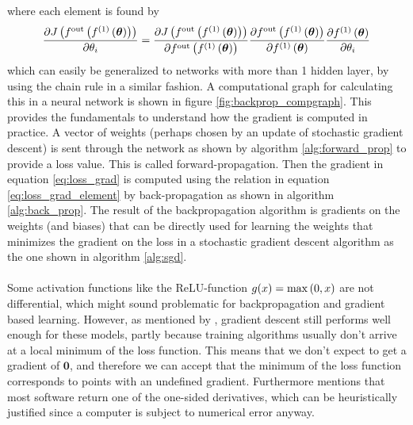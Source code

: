 where each element is found by
\begin{equation} \label{eq:loss_grad_element}
    \frac{\partial J\left (f^{\text{out}} \left (f^{(1)}\left (\boldsymbol{\theta}\right)\right)\right)}{\partial \theta_i} = \frac{\partial J\left (f^{\text{out}} \left (f^{(1)}\left (\boldsymbol{\theta}\right)\right)\right)}{\partial f^{\text{out}} \left (f^{(1)}\left (\boldsymbol{\theta}\right)\right)} 
    \frac{\partial f^{\text{out}} \left (f^{(1)}\left (\boldsymbol{\theta}\right)\right)}{\partial f^{(1)}\left (\boldsymbol{\theta}\right)} 
    \frac{\partial f^{(1)}\left (\boldsymbol{\theta}\right)}{\partial \theta_i}
\end{equation}
which can easily be generalized to networks with more than 1 hidden layer, by using the chain rule in a similar fashion. A computational graph for calculating this in a neural network is shown in figure \ref{fig:backprop_compgraph}. This provides the fundamentals to understand how the gradient is computed in practice. A vector of weights (perhaps chosen by an update of stochastic gradient descent) is sent through the network as shown by algorithm \ref{alg:forward_prop} to provide a loss value. This is called forward-propagation. Then the gradient in equation \ref{eq:loss_grad} is computed using the relation in equation \ref{eq:loss_grad_element} by back-propagation as shown in algorithm \ref{alg:back_prop}. The result of the backpropagation algorithm is gradients on the weights (and biases) that can be directly used for learning the weights that minimizes the gradient on the loss in a stochastic gradient descent algorithm as the one shown in algorithm \ref{alg:sgd}.\\
\\
Some activation functions like the ReLU-function $g(x) = \max \left (0, x\right)$ are not differential, which might sound problematic for backpropagation and gradient based learning. However, as mentioned by \cite{Goodfellow-et-al-2016}, gradient descent still performs well enough for these models, partly because training algorithms usually don't arrive at a local minimum of the loss function. This means that we don't expect to get a gradient of $\boldsymbol{0}$, and therefore we can accept that the minimum of the loss function corresponds to points with an undefined gradient. Furthermore \cite{Goodfellow-et-al-2016} mentions that most software return one of the one-sided derivatives, which can be heuristically justified since a computer is subject to numerical error anyway. \\
\\

